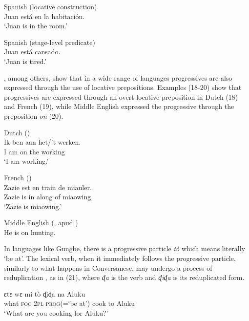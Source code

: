 \documentclass[output=paper]{langsci/langscibook}
\begin{document}
\ea%
         Spanish (locative construction)\\
        Juan está en la habitación.\\
    \glt ‘Juan is in the room.’
\z

\ea%
    	 Spanish (stage-level predicate)\\
        Juan está cansado.\\
    \glt ‘Juan is tired.’
\z

\citet{Mateu1999}, among others, show that in a wide range of languages progressives are also expressed through the use of locative prepositions. Examples (18-20) show that progressives are expressed through an overt locative preposition in Dutch (18) and French (19), while Middle English expressed the progressive through the preposition \textit{on} (20).

\ea%
         Dutch (\citealt[180-182]{vanGelderen1993})\\
    \gll Ik ben aan het/’t  werken.\\
         I  am  on  the working\\
    \glt ‘I am working.’
\z

\ea%
        French (\citealt[8]{Demirdache1997})\\
    \gll Zazie  est en  train   de  miauler.\\
         Zazie  is  in  along   of  miaowing\\
    \glt ‘Zazie is miaowing.'
\z

\ea%
        Middle English (\citealt[168]{Jespersen1949}, apud \citealt[132]{Bybee1994})\\
        He is  on  hunting.
\z

In languages like Gungbe, there is a progressive particle \textit{tò} which means literally ‘be at’. The lexical verb, when it immediately follows the progressive particle, similarly to what happens in Conversanese, may undergo a process of reduplication \citep{Aboh2004,Aboh2009}, as in (21), where \textit{ɖa} is the verb and \textit{ɖiɖa} is its reduplicated form.

\ea%
    \label{ex:lorusso:21}
    \gll ɛtɛ   wɛ   mi   tò       ɖiɖa   na  Aluku \\
          what  \textsc{foc} \textsc{2pl} {\textsc{prog}(=‘be at’)}   cook  to  Aluku \\
    \glt ‘What are you cooking for Aluku?’ \citep{Aboh2004} 
\z   
\end{document}

